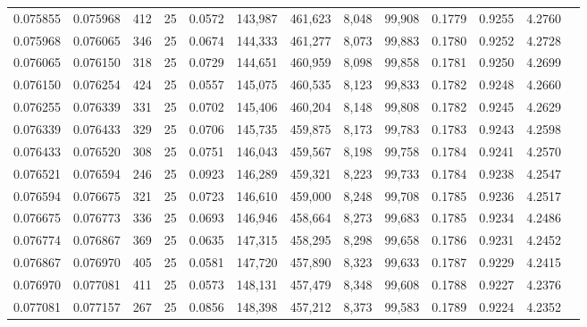 \begin{tabular}{rrrrrrrrrrrrr}
0.075855 & 0.075968 &   412 &  25 &                                     0.0572 & 143,987 & 461,623 &   8,048 &  99,908 & 0.1779 & 0.9255 & 4.2760 \\
0.075968 & 0.076065 &   346 &  25 &                                     0.0674 & 144,333 & 461,277 &   8,073 &  99,883 & 0.1780 & 0.9252 & 4.2728 \\
0.076065 & 0.076150 &   318 &  25 &                                     0.0729 & 144,651 & 460,959 &   8,098 &  99,858 & 0.1781 & 0.9250 & 4.2699 \\
0.076150 & 0.076254 &   424 &  25 &                                     0.0557 & 145,075 & 460,535 &   8,123 &  99,833 & 0.1782 & 0.9248 & 4.2660 \\
0.076255 & 0.076339 &   331 &  25 &                                     0.0702 & 145,406 & 460,204 &   8,148 &  99,808 & 0.1782 & 0.9245 & 4.2629 \\
0.076339 & 0.076433 &   329 &  25 &                                     0.0706 & 145,735 & 459,875 &   8,173 &  99,783 & 0.1783 & 0.9243 & 4.2598 \\
0.076433 & 0.076520 &   308 &  25 &                                     0.0751 & 146,043 & 459,567 &   8,198 &  99,758 & 0.1784 & 0.9241 & 4.2570 \\
0.076521 & 0.076594 &   246 &  25 &                                     0.0923 & 146,289 & 459,321 &   8,223 &  99,733 & 0.1784 & 0.9238 & 4.2547 \\
0.076594 & 0.076675 &   321 &  25 &                                     0.0723 & 146,610 & 459,000 &   8,248 &  99,708 & 0.1785 & 0.9236 & 4.2517 \\
0.076675 & 0.076773 &   336 &  25 &                                     0.0693 & 146,946 & 458,664 &   8,273 &  99,683 & 0.1785 & 0.9234 & 4.2486 \\
0.076774 & 0.076867 &   369 &  25 &                                     0.0635 & 147,315 & 458,295 &   8,298 &  99,658 & 0.1786 & 0.9231 & 4.2452 \\
0.076867 & 0.076970 &   405 &  25 &                                     0.0581 & 147,720 & 457,890 &   8,323 &  99,633 & 0.1787 & 0.9229 & 4.2415 \\
0.076970 & 0.077081 &   411 &  25 &                                     0.0573 & 148,131 & 457,479 &   8,348 &  99,608 & 0.1788 & 0.9227 & 4.2376 \\
0.077081 & 0.077157 &   267 &  25 &                                     0.0856 & 148,398 & 457,212 &   8,373 &  99,583 & 0.1789 & 0.9224 & 4.2352 \\

\end{tabular}
